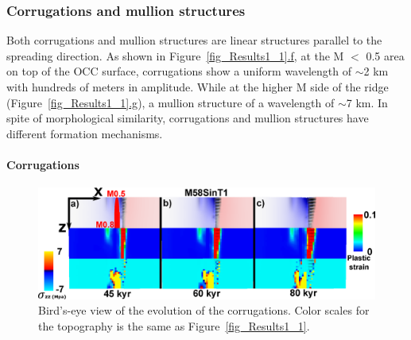 
\subsubsection{Corrugations and mullion structures}

Both corrugations and mullion structures are linear structures parallel to the spreading direction. As shown in Figure~\hyperref[fig_Results1_1]{\ref{fig_Results1_1}.f}, at the M $<$ 0.5 area on top of the OCC surface, corrugations show a uniform wavelength of $\sim$2 km with hundreds of meters in amplitude. While at the higher M side of the ridge (Figure~\hyperref[fig_Results1_1]{\ref{fig_Results1_1}.g}), a mullion structure of a wavelength of $\sim$7 km. In spite of morphological similarity, corrugations and mullion structures have different formation mechanisms. 

\paragraph{Corrugations}

\begin{figure}[h]
  \centering
    \includegraphics[width=1.0\textwidth]{./Figures/fig_Results_3_2_6_corrugations_evolution.eps}
  \caption{Bird's-eye view of the evolution of the corrugations. Color scales for the topography is the same as Figure~\hyperref[fig_Results1_1]{\ref{fig_Results1_1}}.}
 \label{fig_Results_3_2_6_corrugations_evolution}
\end{figure}

